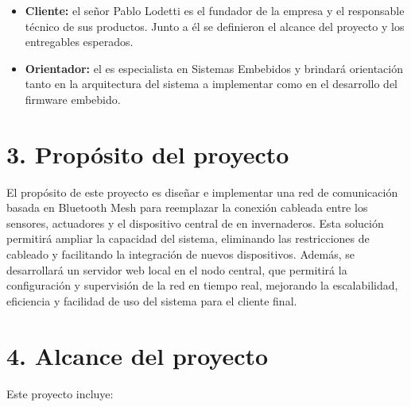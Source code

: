 \documentclass[
11pt, %
]{charter}
\begin{document}
\begin{itemize}
    \item \textbf{Cliente:} el señor Pablo Lodetti es el fundador de la empresa {\empclientename} y el responsable técnico de sus productos. Junto a él se definieron el alcance del proyecto y los entregables esperados.  
    \item \textbf{Orientador:} el {\supname} es especialista en Sistemas Embebidos y brindará orientación tanto en la arquitectura del sistema a implementar como en el desarrollo del firmware embebido. 
\end{itemize}

\section{3. Propósito del proyecto}
\label{sec:proposito}

El propósito de este proyecto es diseñar e implementar una red de comunicación basada en Bluetooth Mesh para reemplazar la conexión cableada entre los sensores, actuadores y el dispositivo central de {\empclientename} en invernaderos. Esta solución permitirá ampliar la capacidad del sistema, eliminando las restricciones de cableado y facilitando la integración de nuevos dispositivos. Además, se desarrollará un servidor web local en el nodo central, que permitirá la configuración y supervisión de la red en tiempo real, mejorando la escalabilidad, eficiencia y facilidad de uso del sistema para el cliente final.

\section{4. Alcance del proyecto}
\label{sec:alcance}

Este proyecto incluye: 
\end{document}
